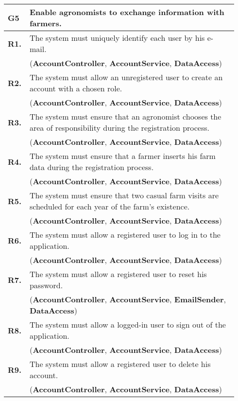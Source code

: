 \begin{longtable}{p{0.06\linewidth} p{0.88\linewidth}} 
    \toprule
    \textbf{G5} & Enable agronomists to exchange information with farmers. \\ 
    \midrule
    
	\textbf{R1.} & The system must uniquely identify each user by his e-mail. \\
	& (\textbf{AccountController}, \textbf{AccountService}, \textbf{DataAccess})\\
	\textbf{R2.} & The system must allow an unregistered user to create an account with a chosen role. \\
	& (\textbf{AccountController}, \textbf{AccountService}, \textbf{DataAccess})\\
	\textbf{R3.} & The system must ensure that an agronomist chooses the area of responsibility during the registration process. \\
	& (\textbf{AccountController}, \textbf{AccountService}, \textbf{DataAccess})\\
	\textbf{R4.} & The system must ensure that a farmer inserts his farm data during the registration process.\\
	& (\textbf{AccountController}, \textbf{AccountService}, \textbf{DataAccess})\\
	\textbf{R5.} & The system must ensure that two casual farm visits are scheduled for each year of the farm's existence.\\
	& (\textbf{AccountController}, \textbf{AccountService}, \textbf{DataAccess})\\
	\textbf{R6.} & The system must allow a registered user to log in to the application. \\
	& (\textbf{AccountController}, \textbf{AccountService}, \textbf{DataAccess})\\
	\textbf{R7.} & The system must allow a registered user to reset his password. \\
	& (\textbf{AccountController}, \textbf{AccountService}, \textbf{EmailSender}, \textbf{DataAccess})\\
	\textbf{R8.} & The system must allow a logged-in user to sign out of the application. \\
	& (\textbf{AccountController}, \textbf{AccountService}, \textbf{DataAccess})\\
	\textbf{R9.} & The system must allow a registered user to delete his account. \\
	& (\textbf{AccountController}, \textbf{AccountService}, \textbf{DataAccess})\\
	

\end{longtable}
